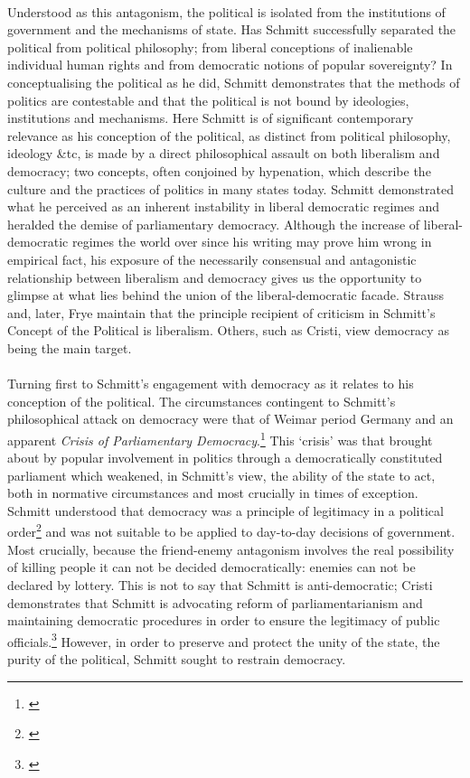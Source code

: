 \documentclass[12pt,a4paper,titlepage]{article}
\begin{document}
\paragraph{}Understood as this antagonism, the political is isolated from the institutions of government and the mechanisms of state. Has Schmitt successfully separated the political from political philosophy; from liberal conceptions of inalienable individual human rights and from democratic notions of popular sovereignty? In conceptualising the political as he did, Schmitt demonstrates that the methods of politics are contestable and that the political is not bound by ideologies, institutions and mechanisms. Here Schmitt is of significant contemporary relevance as his conception of the political, as distinct from political philosophy, ideology \&tc, is made by a direct philosophical assault on both liberalism and democracy; two concepts, often conjoined by hypenation, which describe the culture and the practices of politics in many states today. Schmitt demonstrated what he perceived as an inherent instability in liberal democratic regimes and heralded the demise of parliamentary democracy. Although the increase of liberal-democratic regimes the world over since his writing may prove him wrong in empirical fact, his exposure of the necessarily consensual and antagonistic relationship between liberalism and democracy gives us the opportunity to glimpse at what lies behind the union of the liberal-democratic facade. Strauss and, later, Frye maintain that the principle recipient of criticism in Schmitt's Concept of the Political is liberalism. Others, such as Cristi, view democracy as being the main target.

\paragraph{}Turning first to Schmitt's engagement with democracy as it relates to his conception of the political. The circumstances contingent to Schmitt's philosophical attack on democracy were that of Weimar period Germany and an apparent \textit{Crisis of Parliamentary Democracy}.\footnote{\cite{schmitt:1985pd}} This `crisis' was that brought about by popular involvement in politics through a democratically constituted parliament which weakened, in Schmitt's view, the ability of the state to act, both in normative circumstances and most crucially in times of exception. Schmitt understood that democracy was a principle of legitimacy in a political order\footnote{\cite[p.285]{cristi1993ldc}} and was not suitable to be applied to day-to-day decisions of government. Most crucially, because the friend-enemy antagonism involves the real possibility of killing people it can not be decided democratically: enemies can not be declared by lottery. This is not to say that Schmitt is anti-democratic; Cristi demonstrates that Schmitt is advocating reform of parliamentarianism and maintaining democratic procedures in order to ensure the legitimacy of public officials.\footnote{\cite[p.283-4]{cristi1993ldc}} However, in order to preserve and protect the unity of the state, the purity of the political, Schmitt sought to restrain democracy.
\end{document}
